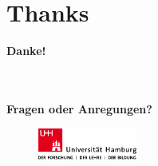 
\section*{Thanks}

\begin{frame}
    
    \centering
    \vspace{5pt}
    
    \textbf{\Huge Danke!}
 
    \ \\
    \ \\
    \textbf{Fragen oder Anregungen?}
    
    
    \vspace{5pt}
    \begin{figure}
      \centering\includegraphics[height=30pt]{assets/logo/uhh.pdf}
    \end{figure}
\end{frame}